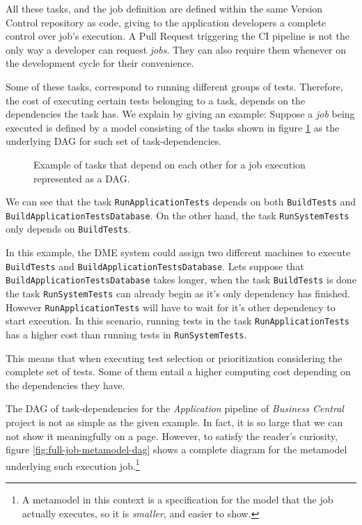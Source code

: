 All these tasks, and the job definition are defined within the same
Version Control repository as code, giving to the application developers a complete 
control over job's execution. A Pull Request triggering the CI pipeline is not the only way 
a developer can request \emph{jobs}. They can also require them whenever on the development 
cycle for their convenience.

Some of these tasks, correspond to running different groups of tests. Therefore, the cost of executing 
certain tests belonging to a task, depends on the dependencies the task has.
We explain by giving an example: Suppose a \emph{job} being executed 
is defined by a model consisting of the tasks shown in figure \ref{fig:example-dag-tasks} as the 
underlying DAG for such set of task-dependencies. 

\begin{figure}
    \def\svgwidth{\columnwidth}
    
    \caption{Example of tasks that depend on each other for a job execution represented as a DAG.}
    \label{fig:example-dag-tasks}
\end{figure}

We can see that the task \texttt{RunApplicationTests} depends on both \texttt{BuildTests}
and \texttt{BuildApplicationTestsDatabase}. On the other hand, the task 
\texttt{RunSystemTests} only depends on \texttt{BuildTests}.

In this example, the DME system could assign two different machines to execute 
\texttt{BuildTests} and \texttt{BuildApplicationTestsDatabase}. Lets suppose that
\texttt{BuildApplicationTestsDatabase} takes longer, when the task \texttt{BuildTests}
is done the task \texttt{RunSystemTests} can already begin as it's only dependency
has finished. However \texttt{RunApplicationTests} will have to wait for it's other
dependency to start execution. In this scenario, running tests in the task \texttt{RunApplicationTests}
has a higher cost than running tests in \texttt{RunSystemTests}.

This means that when executing test selection or prioritization considering the complete
set of tests. Some of them entail a higher computing cost depending on the dependencies they
have.

The DAG of task-dependencies for the \emph{Application} pipeline of \emph{Business Central} project is not as simple 
as the given example. In fact, it is so large that we can not show it meaningfully on a
page. However, to satisfy the reader's curiosity, figure \ref{fig:full-job-metamodel-dag} 
shows a complete diagram for the metamodel underlying such execution job.\footnote{A 
metamodel in this context is a specification for the model that the job actually executes, so it is \textit{smaller}, and easier to show.}

